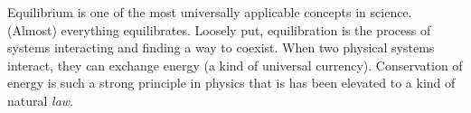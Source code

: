\documentclass[a4paper]{article}
\begin{document}
Equilibrium is one of the most universally applicable concepts in science. (Almost) everything equilibrates. Loosely put, equilibration is the process of systems interacting and finding a way to coexist. When two physical systems interact, they can exchange energy (a kind of universal currency). Conservation of energy is such a strong principle in physics that is has been elevated to a kind of natural \emph{law}.
\end{document}
